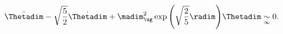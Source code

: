 \begin{equation}
\label{eq:evolthetaasymp}
\ddot{\Thetadim} - \sqrt{\dfrac{5}{2}} \dot{\Thetadim} + \madim_\ug^2
\exp{\left(\sqrt{\dfrac{2}{5}} \radim\right)} \Thetadim
\underset{\infty}{\sim} 0.
\end{equation}

